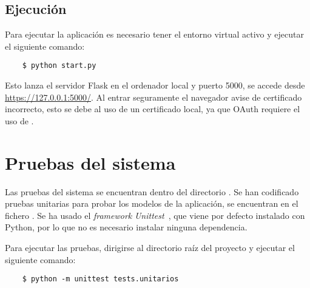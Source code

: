 \subsection{Ejecución}

Para ejecutar la aplicación es necesario tener el entorno virtual activo y 
ejecutar el siguiente comando:
\begin{lstlisting}
	$ python start.py
\end{lstlisting}
Esto lanza el servidor Flask en el ordenador local y puerto 5000, se accede 
desde \url{https://127.0.0.1:5000/}. Al entrar seguramente el navegador avise 
de certificado incorrecto, esto se debe al uso de un certificado local, ya que 
OAuth requiere el uso de .

\section{Pruebas del sistema}

Las pruebas del sistema se encuentran dentro del directorio . Se 
han codificado pruebas unitarias para probar los modelos de la aplicación, se 
encuentran en el fichero . Se ha usado el \textit{framework} 
\textit{Unittest}~\cite{unittest}, que viene por defecto instalado con Python, 
por lo que no es necesario instalar ninguna dependencia.

Para ejecutar las pruebas, dirigirse al directorio raíz del proyecto y ejecutar 
el siguiente comando:
\begin{lstlisting}
	$ python -m unittest tests.unitarios
\end{lstlisting}